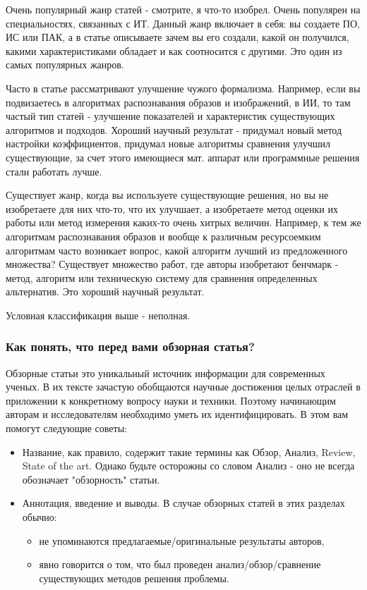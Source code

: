 \documentclass{report}
\begin{document}
Очень популярный жанр статей - смотрите, я что-то изобрел. Очень популярен на специальностях, связанных с ИТ. Данный жанр включает в себя: вы создаете ПО, ИС или ПАК, а в статье описываете зачем вы его создали, какой он получился, какими характеристиками обладает и как соотносится с другими. Это один из самых популярных жанров.

Часто в статье рассматривают улучшение чужого формализма. Например, если вы подвизаетесь в алгоритмах распознавания образов и изображений, в ИИ, то там частый тип статей - улучшение показателей и характеристик существующих алгоритмов и подходов. Хороший научный результат - придумал новый метод настройки коэффициентов, придумал новые алгоритмы сравнения улучшил существующие, за счет этого имеющиеся мат. аппарат или программные решения стали работать лучше. 

Существует жанр, когда вы используете существующие решения, но вы не изобретаете для них что-то, что их улучшает, а изобретаете метод оценки их работы или метод измерения каких-то очень хитрых величин. Например, к тем же алгоритмам распознавания образов и вообще к различным ресурсоемким алгоритмам часто возникает вопрос, какой алгоритм лучший из предложенного множества? Существует множество работ, где авторы изобретают бенчмарк - метод, алгоритм или техническую систему для сравнения определенных альтернатив. Это хороший научный результат. 

Условная классификация выше - неполная. 

\subsubsection{Как понять, что перед вами обзорная статья?}
Обзорные статьи это уникальный источник информации для современных ученых. В их тексте зачастую обобщаются научные достижения целых отраслей в приложении к конкретному вопросу науки и техники. Поэтому начинающим авторам и исследователям необходимо уметь их идентифицировать. В этом вам помогут следующие советы:

\begin{itemize}
	\item Название, как правило, содержит такие термины как Обзор, Анализ, Review, State of the art. Однако будьте осторожны со словом Анализ - оно не всегда обозначает "обзорность" статьи.
	\item Аннотация, введение и выводы. В случае обзорных статей в этих разделах обычно:
	\begin{itemize}
		\item не упоминаются предлагаемые/оригинальные результаты авторов,
		\item явно говорится о том, что был проведен анализ/обзор/сравнение существующих методов решения проблемы.
	\end{itemize}

\end{itemize}
\end{document}
